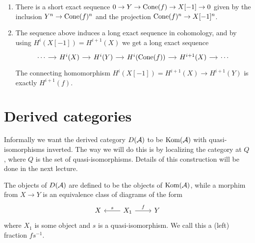 \documentclass[a4paper, UKenglish]{report}
\begin{document}
\begin{enumerate}
    \item There is a short exact sequence $0 \to Y \to \operatorname{Cone}(f) \to X[-1] \to 0$ given by the inclusion $Y^n \to \operatorname{Cone}(f)^n$ and the projection $\operatorname{Cone}(f)^n \to X[-1]^n$.

    \item The sequence above induces a long exact sequence in cohomology, and by using $H^i(X[-1]) = H^{i+1}(X)$ we get a long exact sequence
    \[ 
        \begin{tikzcd}[column sep = small]
            \cdots \arrow[r] & H^i(X) \arrow[r] & H^i(Y) \arrow[r] & H^i(\Cone(f)) \arrow[r] & H^{i+1}(X) \arrow[r] & \cdots 
        \end{tikzcd}
    \]
    The connecting homomorphism $H^i(X[-1]) = H^{i+1}(X) \to H^{i+1}(Y)$ is exactly $H^{i+1}(f)$.
\end{enumerate}

\section{Derived categories}

Informally we want the derived category $D(\mathcal{A})$ to be $\operatorname{Kom}(\mathcal{A})$ with quasi-isomorphisms inverted. The way we will do this is by localizing the category at $Q$, where $Q$ is the set of quasi-isomorphisms. Details of this construction will be done in the next lecture.

The objects of $D(\mathcal{A})$ are defined to be the objects of $\operatorname{Kom}(\mathcal{A})$, while a morphim from $X \to Y$ is an equivalence class of diagrams of the form
\[ 
    \begin{tikzcd}
        X & \arrow[l, "s", swap]  X_1 \arrow[r, "f"] & Y 
    \end{tikzcd}
\]
where $X_1$ is some object and $s$ is a quasi-isomorphism. We call this a (left) fraction $fs^{-1}$.
\end{document}
